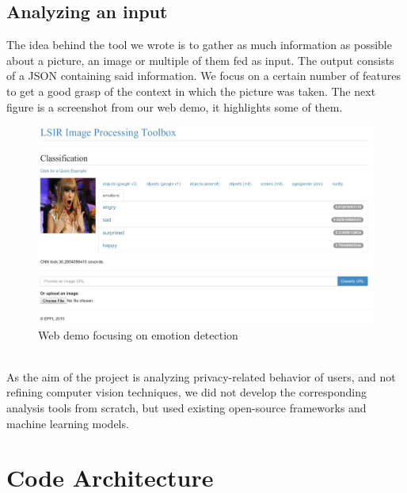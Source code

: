 \documentclass{article}
\begin{document}
    \subsection{Analyzing an input}
        The idea behind the tool we wrote is to gather as much information as possible about a picture, an image or multiple of them fed as input. The output consists of a JSON containing said information. We focus on a certain number of features to get a good grasp of the context in which the picture was taken. The next figure is a screenshot from our web demo, it highlights some of them. 
        \begin{figure}[h]
            \centering
            \includegraphics[scale=0.18]{emotions.jpg}
            \caption{Web demo focusing on emotion detection}
          \label{fig:emotions}
        \end{figure}
        \\As the aim of the project is analyzing privacy-related behavior of users, and not refining computer vision techniques, we did not develop the corresponding analysis tools from scratch, but used existing open-source frameworks and machine learning models.

\newpage
\section{Code Architecture}
\end{document}
